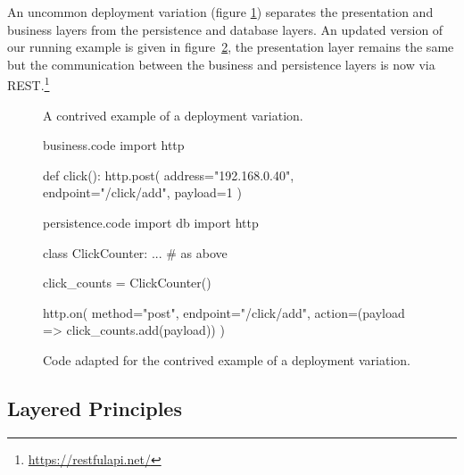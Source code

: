 \pagebreak
An uncommon deployment variation (figure \ref{fig:uncommon-diagram}) separates
the presentation and business layers from the persistence and database layers.
An updated version of our running example is given in figure~\ref{fig:uncommon-code},
the presentation layer remains the same but the communication between the
business and persistence layers is now via REST.\footnote{\url{https://restfulapi.net/}}

\begin{figure}[ht]
    \centering
    \caption{A contrived example of a deployment variation.}
    \label{fig:uncommon-diagram}
\end{figure}

\begin{figure}[H]
\begin{code}[style=python]{business.code}
import http

def click():
    http.post(
        address="192.168.0.40",
        endpoint="/click/add",
        payload=1
    )
\end{code}

\begin{code}[style=python]{persistence.code}
import db
import http

class ClickCounter:
    ... # as above

click_counts = ClickCounter()

http.on(
    method="post",
    endpoint="/click/add",
    action=(payload => click_counts.add(payload))
)
\end{code}
\caption{Code adapted for the contrived example of a deployment variation.}
\label{fig:uncommon-code}
\end{figure}

\subsection{Layered Principles}

